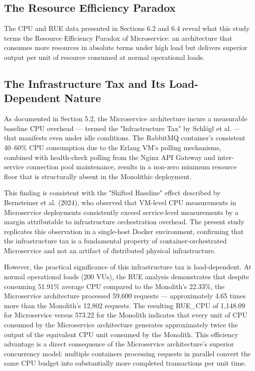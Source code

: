 \subsection{The Resource Efficiency Paradox}

The CPU and RUE data presented in Sections 6.2 and 6.4 reveal what this study terms the Resource Efficiency Paradox of Microservice: an architecture that consumes more resources in absolute terms under high load but delivers superior output per unit of resource consumed at normal operational loads.

\subsection{The Infrastructure Tax and Its Load-Dependent Nature}

As documented in Section 5.2, the Microservice architecture incurs a measurable baseline CPU overhead — termed the "Infrastructure Tax" by Schlögl et al. \cite{Schloegl2024} — that manifests even under idle conditions. The RabbitMQ container's consistent 40–60\% CPU consumption due to the Erlang VM's polling mechanisms, combined with health-check polling from the Nginx API Gateway and inter-service connection pool maintenance, results in a non-zero minimum resource floor that is structurally absent in the Monolithic deployment.

This finding is consistent with the "Shifted Baseline" effect described by Bernsteiner et al. (2024), who observed that VM-level CPU measurements in Microservice deployments consistently exceed service-level measurements by a margin attributable to infrastructure orchestration overhead. The present study replicates this observation in a single-host Docker environment, confirming that the infrastructure tax is a fundamental property of container-orchestrated Microservice and not an artifact of distributed physical infrastructure.

However, the practical significance of this infrastructure tax is load-dependent. At normal operational loads (200 VUs), the RUE analysis demonstrates that despite consuming 51.91\% average CPU compared to the Monolith's 22.33\%, the Microservice architecture processed 59,600 requests — approximately 4.65 times more than the Monolith's 12,802 requests. The resulting RUE\_CPU of 1,148.09 for Microservice versus 573.22 for the Monolith indicates that every unit of CPU consumed by the Microservice architecture generates approximately twice the output of the equivalent CPU unit consumed by the Monolith. This efficiency advantage is a direct consequence of the Microservice architecture's superior concurrency model: multiple containers processing requests in parallel convert the same CPU budget into substantially more completed transactions per unit time.

